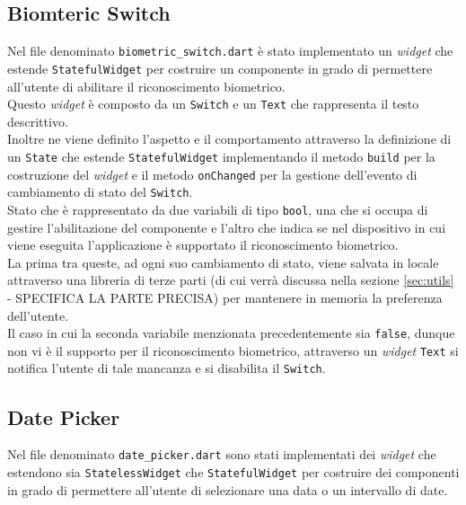 \subsection{Biomteric Switch}
\label{subsec:biometric-switch}

Nel file denominato \lstinline{biometric_switch.dart} è stato implementato un \emph{widget} che estende \lstinline{StatefulWidget} per costruire un componente in grado di permettere all'utente di abilitare il riconoscimento biometrico. \\
Questo \emph{widget} è composto da un \lstinline{Switch}\cite{site:switch} e un \lstinline{Text}\cite{site:text} che rappresenta il testo descrittivo.\\
Inoltre ne viene definito l'aspetto e il comportamento attraverso la definizione di un \lstinline{State} che estende \lstinline{StatefulWidget} implementando il metodo \lstinline{build} per la costruzione del \emph{widget} e il metodo \lstinline{onChanged} per la gestione dell'evento di cambiamento di stato del \lstinline{Switch}.\\
Stato che è rappresentato da due variabili di tipo \lstinline{bool}, una che si occupa di gestire l'abilitazione del componente e l'altro che indica se nel dispositivo in cui viene eseguita l'applicazione è supportato il riconoscimento biometrico.\\
La prima tra queste, ad ogni suo cambiamento di stato, viene salvata in locale attraverso una libreria di terze parti (di cui verrà discussa nella sezione \ref{sec:utils} - SPECIFICA LA PARTE PRECISA) per mantenere in memoria la preferenza dell'utente. \\
Il caso in cui la seconda variabile menzionata precedentemente sia \lstinline{false}, dunque non vi è il supporto per il riconoscimento biometrico, attraverso un \emph{widget} \lstinline{Text} si notifica l'utente di tale mancanza e si disabilita il \lstinline{Switch}.

\subsection{Date Picker}
\label{subsec:date-picker}

Nel file denominato \lstinline{date_picker.dart} sono stati implementati dei \emph{widget} che estendono sia \lstinline{StatelessWidget} che \lstinline{StatefulWidget} per costruire dei componenti in grado di permettere all'utente di selezionare una data o un intervallo di date.\\

